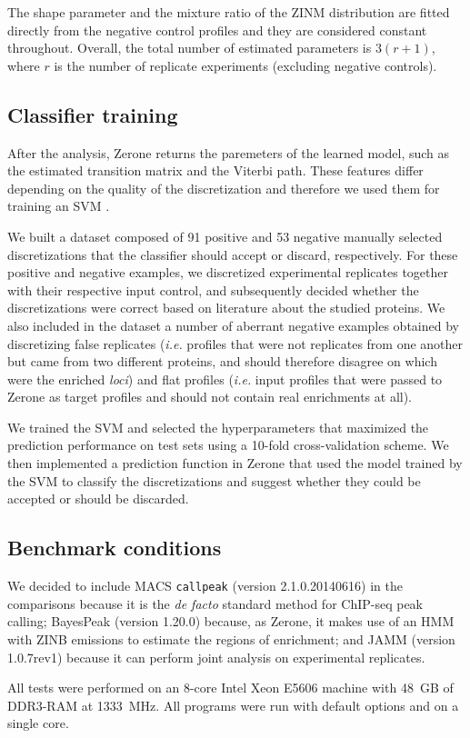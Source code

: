 \documentclass{bioinfo}
\begin{document}
\begin{methods}
The shape parameter and the mixture ratio of the ZINM distribution
are fitted directly from the negative control profiles and they are
considered constant throughout. Overall, the total number of estimated
parameters is $3(r+1)$, where $r$ is the number of replicate experiments
(excluding negative controls).

\subsection{Classifier training}
After the analysis, Zerone returns the paremeters of the learned model, such as
the estimated transition matrix and the Viterbi path. These
features differ depending on the quality of the discretization and therefore we
used them for training an SVM \citep{Chang2011,e1071}.

We built a dataset composed of 91 positive and 53 negative manually selected
discretizations that the classifier should accept or discard, respectively.
For these positive and negative examples, we discretized experimental replicates
together with their respective input control, and subsequently decided whether
the discretizations were correct based on literature about the studied proteins.
We also included in the dataset a number of aberrant negative examples obtained
by discretizing false replicates (\textit{i.e.} profiles that were not
replicates from one another but came from two different proteins, and should
therefore disagree on which were the enriched \textit{loci}) and flat profiles
(\textit{i.e.} input profiles that were passed to Zerone as target profiles and
should not contain real enrichments at all).

We trained the SVM and selected the hyperparameters that maximized the
prediction performance on test sets using a 10-fold cross-validation scheme. We
then implemented a prediction function in Zerone that used the model trained by
the SVM to classify the discretizations and suggest whether they could be
accepted or should be discarded.

\subsection{Benchmark conditions}
We decided to include MACS \texttt{callpeak} (version 2.1.0.20140616) in
the comparisons because it is the \textit{de facto} standard method
for ChIP-seq peak calling; BayesPeak (version 1.20.0) because, as Zerone,
it makes use of an HMM with ZINB emissions to estimate the regions of
enrichment; and JAMM (version 1.0.7rev1) because it can perform joint
analysis on experimental replicates.

All tests were performed on an 8-core Intel Xeon E5606 machine with 48~GB of
DDR3-RAM at 1333~MHz. All programs were run with default options and on a
single core.

\end{methods}
\end{document}
